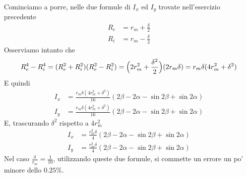 \noindent Cominciamo a porre, nelle due formule di $I_x$ ed $I_y$ trovate nell'esercizio precedente 
\begin{align*}
R_e &= r_m +\frac{\delta}{2} \\
R_i &= r_m - \frac{\delta}{2}
\end{align*}
Osserviamo intanto che 
\begin{equation*}
R_{e}^{4}-R_{i}^{4} = (R_{e}^{2}+R_{i}^{2})(R_{e}^{2}-R_{i}^{2}) = \Bigl(2r_{m}^{2}+\frac{\delta^2}{2}\Bigr)(2r_{m}\delta) = r_{m}\delta(4r_{m}^{2}+\delta^2)
\end{equation*}
E quindi
\begin{align*}
I_x &= \frac{r_{m}\delta(4r_{m}^{2}+\delta^2)}{16}(2\beta-2\alpha-\sin 2\beta+\sin 2\alpha)  \\
I_y &= \frac{r_{m}\delta(4r_{m}^{2}+\delta^2)}{16}(2\beta-2\alpha-\sin 2\beta+\sin 2\alpha)
\end{align*}
E, trascurando $\delta^2$ rispetto a $4r_{m}^{2}$ 
\begin{align*}
I_x &= \frac{r_{m}^{3}\delta}{4}(2\beta-2\alpha-\sin 2\beta+\sin 2\alpha)  \\
I_y &= \frac{r_{m}^{3}\delta}{4}(2\beta-2\alpha-\sin 2\beta+\sin 2\alpha)
\end{align*}
Nel caso $\frac{\delta}{r_m} = \frac{1}{10}$, utilizzando queste due formule, si commette un errore un po' minore dello $0.25\%$.
\clearpage
